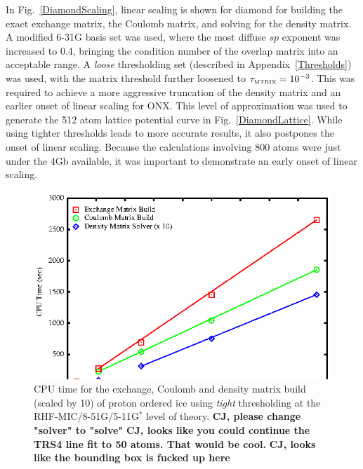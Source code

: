 \documentclass[prb,aps,nobibnotes,twocolumn,doublespace,twocolumngrid,superbib]{revtex4}
\begin{document}
In Fig.~\ref{DiamondScaling}, linear scaling is shown for diamond for 
building the exact exchange matrix, the Coulomb matrix, and solving for the density matrix. 
A modified 6-31G basis set was used, where the most diffuse $sp$ exponent was increased to 
0.4, bringing the condition number of the overlap matrix into an acceptable range.  A 
{\it loose} thresholding set (described in Appendix~\ref{Thresholds}) was used, with 
the matrix threshold further loosened to $\Huge \tau_{\rm \scriptscriptstyle MTRIX}=10^{-3}$.  
This was required to achieve a more aggressive truncation of the density matrix and an earlier 
onset of linear scaling for {\sc ONX}.  This level of approximation was used to generate 
the 512 atom lattice potential curve in Fig.~\ref{DiamondLattice}. While using tighter thresholds 
leads to more accurate results, it also postpones the onset of linear scaling. Because the 
calculations involving 800 atoms were just under the 4Gb available, it was important to 
demonstrate an early onset of linear scaling.  


\begin{figure}[h]
\caption{CPU time for the exchange, Coulomb and density 
matrix build (scaled by 10) of proton ordered ice using {\it tight}
thresholding at the RHF-MIC/8-51G/5-11G$^*$ level of theory.
{\bf CJ, please change "solver" to "solve"}
{\bf CJ, looks like you could continue the TRS4 line fit to 50 atoms.  That would be cool.}
{\bf CJ, looks like the bounding box is fucked up here}
}
\label{IceScaling}
{\centering \includegraphics{Timing_pIce_ONX_1.ps} \par} 
\end{figure}
\end{document}
